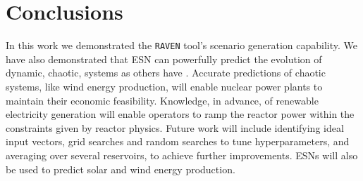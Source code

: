 \section{Conclusions}

In this work we demonstrated the \texttt{RAVEN} tool's scenario generation
capability. We have also demonstrated that \acrlong{ESN} can
powerfully predict the evolution of dynamic, chaotic, systems as others have
\cite{pathak_model-free_2018,wikner_combining_2020,bianchi_reservoir_2020}.
Accurate predictions of chaotic systems, like wind energy production, will
enable nuclear power plants to maintain their economic feasibility.
Knowledge, in advance, of renewable electricity generation will enable
operators to ramp the reactor power within the constraints given by reactor
physics. Future work will include identifying ideal input vectors, grid
searches and random searches to tune hyperparameters, and averaging over
several reservoirs, to achieve further
improvements. \acrshort{ESN}s will also be used to predict solar and wind
energy production.
